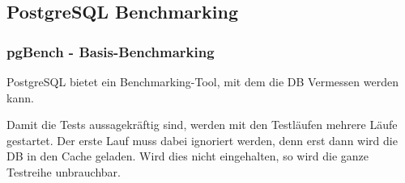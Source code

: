 
\begin{flushleft}
    \subsection{PostgreSQL Benchmarking}
    \subsubsection{pgBench - Basis-Benchmarking}
    PostgreSQL bietet ein Benchmarking-Tool,\cite{TYJFF7AB,VXNYQFTE} mit dem die DB Vermessen werden kann.
\end{flushleft}
\begin{flushleft}
    Damit die Tests aussagekräftig sind, werden mit den Testläufen mehrere Läufe gestartet.
    Der erste Lauf muss dabei ignoriert werden, denn erst dann wird die DB in den Cache geladen.
    Wird dies nicht eingehalten, so wird die ganze Testreihe unbrauchbar.
\end{flushleft}
